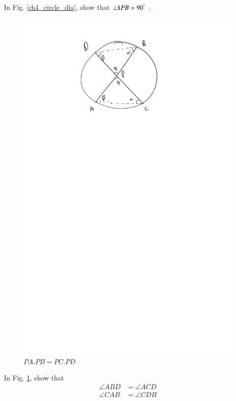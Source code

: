 %
\begin{problem}
In Fig. \ref{ch4_circle_dia}, show that $\angle APB = 90^{\degree}$ .
\end{problem}
\begin{figure}[!h]
	\begin{center}
		
		\includegraphics[width=\columnwidth]{./figs/ch4_chord_product}
		\vspace*{-10cm}
	\end{center}
	\caption{$PA.PB = PC.PD$}
	\label{ch4_chord_product}	
\end{figure}
%
\begin{problem}
	In Fig. \ref{ch4_chord_product}, show that 
	\begin{equation}
	\begin{split}
\angle ABD &= \angle ACD \\
\angle CAB &= \angle CDB	
	\end{split}
	\end{equation}
\end{problem}
